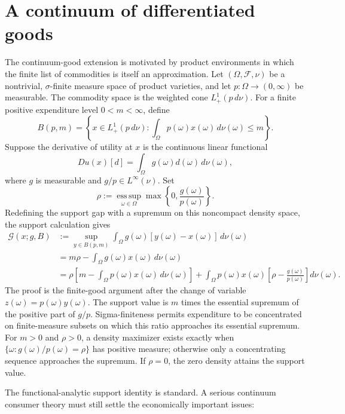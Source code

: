 \documentclass[11pt]{article}
\newcommand{\cG}{\mathcal{G}}
\newcommand{\esssup}{\operatorname*{ess\,sup}}
\theoremstyle{definition}
\theoremstyle{remark}
\begin{document}
\section{A continuum of differentiated goods}

The continuum-good extension is motivated by product environments in which the finite list of
commodities is itself an approximation.  Let $(\Omega,\mathcal F,\nu)$ be a nontrivial,
$\sigma$-finite measure space of product varieties, and let
$p:\Omega\to(0,\infty)$ be measurable.  The commodity space is the weighted cone
$L^1_+(p\,d\nu)$.  For a finite positive expenditure level $0<m<\infty$, define
\[
  B(p,m)=\left\{x\in L^1_+(p\,d\nu):
  \int_\Omega p(\omega)x(\omega)\,d\nu(\omega)\le m\right\}.
\]
Suppose the derivative of utility at $x$ is the continuous linear functional
\[
  D u(x)[d]=\int_\Omega g(\omega)d(\omega)\,d\nu(\omega),
\]
where $g$ is measurable and $g/p\in L^\infty(\nu)$.  Set
\begin{equation}
  \rho
  :=\esssup_{\omega\in\Omega}
  \max\left\{0,\frac{g(\omega)}{p(\omega)}\right\}.
  \label{eq:continuum-rho}
\end{equation}
Redefining the support gap with a supremum on this noncompact density space, the support
calculation gives
\begin{align}
  \cG(x;g,B)
  &:=\sup_{y\in B(p,m)}\int_\Omega g(\omega)[y(\omega)-x(\omega)]\,d\nu(\omega)
  \nonumber\\
  &=m\rho-\int_\Omega g(\omega)x(\omega)\,d\nu(\omega)
  \label{eq:continuum-gap}\\
  &=\rho\left[m-\int_\Omega p(\omega)x(\omega)\,d\nu(\omega)\right]
  +\int_\Omega p(\omega)x(\omega)
  \left[\rho-\frac{g(\omega)}{p(\omega)}\right]d\nu(\omega).
  \label{eq:continuum-decomp}
\end{align}
The proof is the finite-good argument after the change of variable
$z(\omega)=p(\omega)y(\omega)$.  The support value is $m$ times the essential supremum
of the positive part of $g/p$.  Sigma-finiteness permits expenditure to be concentrated on
finite-measure subsets on which this ratio approaches its essential supremum.  For $m>0$ and
$\rho>0$, a density maximizer exists exactly when
$\{\omega:g(\omega)/p(\omega)=\rho\}$ has positive measure; otherwise only a concentrating
sequence approaches the supremum.  If $\rho=0$, the zero density attains the support value.

The functional-analytic support identity is standard.  A serious continuum consumer theory must
still settle the economically important issues:
\end{document}
